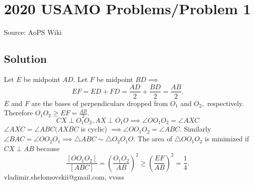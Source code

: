 \documentclass[12pt]{article}
\begin{document}
\section*{{2020 USAMO Problems/Problem 1}}
Source: AoPS Wiki

\subsection*{Solution}
Let $E$ be midpoint $AD.$ Let $F$ be midpoint $BD \implies$ \[EF = ED + FD = \frac {AD}{2} + \frac {BD}{2} = \frac {AB}{2}.\] $E$ and $F$ are the bases of perpendiculars dropped from $O_1$ and $O_2,$ respectively. Therefore $O_1O_2 \ge EF = \frac {AB}{2}.$ \[CX \perp O_1O_2, AX \perp O_1O \implies \angle O O_1O_2 = \angle AXC\] $\angle AXC = \angle ABC (AXBC$ is cyclic) $\implies \angle O O_1O_2 = \angle ABC.$ Similarly $\angle BAC = \angle O O_2 O_1 \implies \triangle ABC \sim \triangle O_2 O_1O.$ The area of $\triangle OO_1O_2$ is minimized if $CX \perp AB$ because \[\frac {[OO_1O_2]} {[ABC]} = \left(\frac {O_1 O_2} {AB}\right)^2 \ge \left(\frac {EF} {AB}\right)^2 = \frac {1}{4}.\] vladimir.shelomovskii@gmail.com, vvsss
\end{document}

